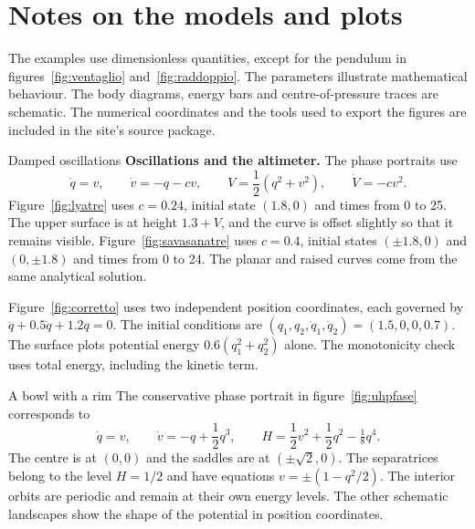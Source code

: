 \section*{Notes on the models and plots}

The examples use dimensionless quantities, except for the pendulum in figures~\ref{fig:ventaglio} and~\ref{fig:raddoppio}. The parameters illustrate mathematical behaviour. The body diagrams, energy bars and centre-of-pressure traces are schematic. The numerical coordinates and the tools used to export the figures are included in the site's source package.

\begin{formule}{Damped oscillations}
\textbf{Oscillations and the altimeter.} The phase portraits use
\[
 \dot q=v,\qquad \dot v=-q-cv,\qquad
 V=\frac{1}{2}(q^2+v^2),\qquad \dot V=-cv^2.
\]
Figure~\ref{fig:lyatre} uses $c=0.24$, initial state $(1.8,0)$ and times from 0 to 25. The upper surface is at height $1.3+V$, and the curve is offset slightly so that it remains visible. Figure~\ref{fig:savasanatre} uses $c=0.4$, initial states $(\pm1.8,0)$ and $(0,\pm1.8)$ and times from 0 to 24. The planar and raised curves come from the same analytical solution.

Figure~\ref{fig:corretto} uses two independent position coordinates, each governed by $\ddot q+0.5\dot q+1.2q=0$. The initial conditions are $(q_1,q_2,\dot q_1,\dot q_2)=(1.5,0,0,0.7)$. The surface plots potential energy $0.6(q_1^2+q_2^2)$ alone. The monotonicity check uses total energy, including the kinetic term.
\end{formule}

\begin{formule}{A bowl with a rim}
The conservative phase portrait in figure~\ref{fig:uhpfase} corresponds to
\[
 \dot q=v,\qquad \dot v=-q+\frac{1}{2}q^3,\qquad
 H=\frac{1}{2}v^2+\frac{1}{2}q^2-\tfrac18q^4.
\]
The centre is at $(0,0)$ and the saddles are at $(\pm\sqrt2,0)$. The separatrices belong to the level $H=1/2$ and have equations $v=\pm(1-q^2/2)$. The interior orbits are periodic and remain at their own energy levels. The other schematic landscapes show the shape of the potential in position coordinates.
\end{formule}

